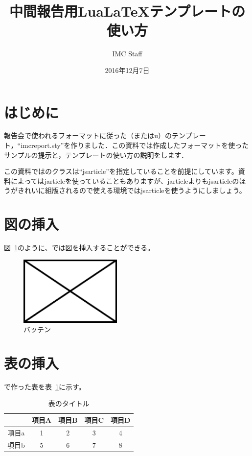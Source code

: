 \documentclass[10pt,a4j,twocolumn]{ltjsarticle}
\title{中間報告用Lua\LaTeX テンプレートの使い方}   %
\author{IMC Staff}                              %
\date{2016年12月7日}                            %
\begin{document}
\maketitle

\section{はじめに}

報告会で使われるフォーマットに従った\pLaTeX（またはu\pLaTeX）のテンプレート，``imcreport.sty''を作りました．この資料では作成したフォーマットを使ったサンプルの提示と，テンプレートの使い方の説明をします．

この資料では\pLaTeX のクラスは``jsarticle''を指定していることを前提にしています。資料によってはjarticleを使っていることもありますが、jarticleよりもjsarticleのほうがきれいに組版されるので使える環境ではjsarticleを使うようにしましょう。

\section{図の挿入}

図~\ref{バッテンのラベル}のように、\pLaTeX では図を挿入することができる。
\begin{figure}[bp]
  \centering
  \includegraphics[width=0.45\textwidth]{./sample_figure.pdf}
  \caption{バッテン}
  \label{バッテンのラベル}
\end{figure}

\section{表の挿入}

\pLaTeX で作った表を表~\ref{表のラベル}に示す。
\begin{table}[bp]
  \centering
  \caption{表のタイトル}
  \label{表のラベル}
  \begin{tabular}{c|cccc}
    \hline
          & 項目A & 項目B & 項目C & 項目D \\
    \hline \hline
    項目a & 1     & 2     & 3     & 4 \\
    項目b & 5     & 6     & 7     & 8 \\
    \hline
  \end{tabular}
\end{table}
\end{document}
